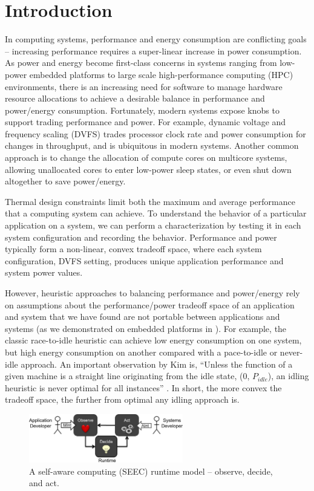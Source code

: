 \section{Introduction}

In computing systems, performance and energy consumption are conflicting goals -- increasing performance requires a super-linear increase in power consumption.
As power and energy become first-class concerns in systems ranging from low-power embedded platforms to large scale high-performance computing (HPC) environments, there is an increasing need for software to manage hardware resource allocations to achieve a desirable balance in performance and power/energy consumption.
Fortunately, modern systems expose knobs to support trading performance and power.
For example, dynamic voltage and frequency scaling (DVFS) trades processor clock rate and power consumption for changes in throughput, and is ubiquitous in modern systems.
Another common approach is to change the allocation of compute cores on multicore systems, allowing unallocated cores to enter low-power sleep states, or even shut down altogether to save power/energy.

Thermal design constraints limit both the maximum and average performance that a computing system can achieve.
To understand the behavior of a particular application on a system, we can perform a characterization by testing it in each system configuration and recording the behavior.
Performance and power typically form a non-linear, convex tradeoff space, where each system configuration, \eg DVFS setting, produces unique application performance and system power values.

However, heuristic approaches to balancing performance and power/energy rely on assumptions about the performance/power tradeoff space of an application and system that we have found are not portable between applications and systems (as we demonstrated on embedded platforms in \cite{Imes2014}).
For example, the classic race-to-idle heuristic can achieve low energy consumption on one system, but high energy consumption on another compared with a pace-to-idle or never-idle approach.
An important observation by Kim \etal is, ``Unless the function of a given machine is a straight line originating from the idle state, (0, $P_{idle}$), an idling heuristic is never optimal for all instances'' \cite{kim-cpsna2015}.
In short, the more convex the tradeoff space, the further from optimal any idling approach is.

\begin{figure}[t]
  \begin{centering}
  \includegraphics[width=0.6\textwidth]{figs/SEEC.png}
  \caption{A self-aware computing (SEEC) runtime model -- observe, decide, and act.}
  \label{fig:seec}
  \end{centering}
\end{figure}


